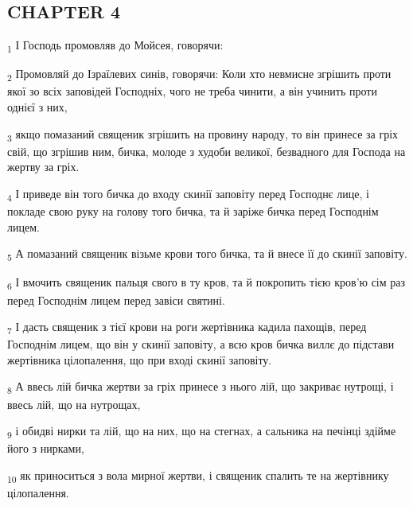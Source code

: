 \subsection{CHAPTER 4}
\begin{tcolorbox}
\textsubscript{1} І Господь промовляв до Мойсея, говорячи:
\end{tcolorbox}
\begin{tcolorbox}
\textsubscript{2} Промовляй до Ізраїлевих синів, говорячи: Коли хто невмисне згрішить проти якої зо всіх заповідей Господніх, чого не треба чинити, а він учинить проти однієї з них,
\end{tcolorbox}
\begin{tcolorbox}
\textsubscript{3} якщо помазаний священик згрішить на провину народу, то він принесе за гріх свій, що згрішив ним, бичка, молоде з худоби великої, безвадного для Господа на жертву за гріх.
\end{tcolorbox}
\begin{tcolorbox}
\textsubscript{4} І приведе він того бичка до входу скинії заповіту перед Господнє лице, і покладе свою руку на голову того бичка, та й заріже бичка перед Господнім лицем.
\end{tcolorbox}
\begin{tcolorbox}
\textsubscript{5} А помазаний священик візьме крови того бичка, та й внесе її до скинії заповіту.
\end{tcolorbox}
\begin{tcolorbox}
\textsubscript{6} І вмочить священик пальця свого в ту кров, та й покропить тією кров'ю сім раз перед Господнім лицем перед завіси святині.
\end{tcolorbox}
\begin{tcolorbox}
\textsubscript{7} І дасть священик з тієї крови на роги жертівника кадила пахощів, перед Господнім лицем, що він у скинії заповіту, а всю кров бичка виллє до підстави жертівника цілопалення, що при вході скинії заповіту.
\end{tcolorbox}
\begin{tcolorbox}
\textsubscript{8} А ввесь лій бичка жертви за гріх принесе з нього лій, що закриває нутрощі, і ввесь лій, що на нутрощах,
\end{tcolorbox}
\begin{tcolorbox}
\textsubscript{9} і обидві нирки та лій, що на них, що на стегнах, а сальника на печінці здійме його з нирками,
\end{tcolorbox}
\begin{tcolorbox}
\textsubscript{10} як приноситься з вола мирної жертви, і священик спалить те на жертівнику цілопалення.
\end{tcolorbox}
